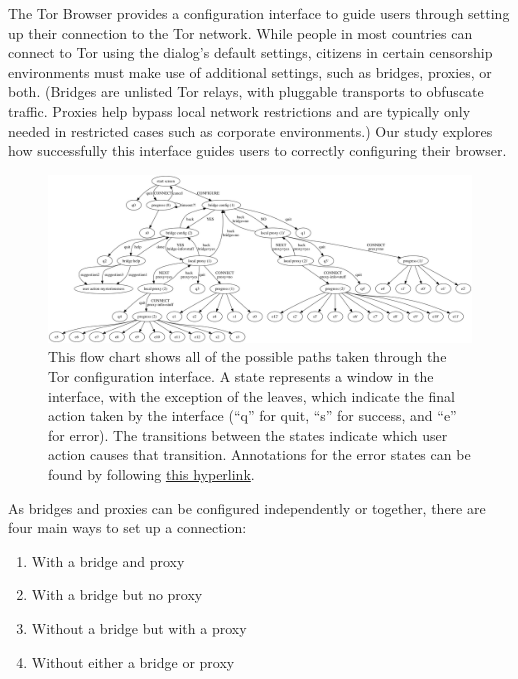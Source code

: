 \documentclass{template}
\begin{document}
The Tor Browser provides a configuration interface to guide users through setting up 
their connection to the
Tor network. While people in most countries can connect to Tor using the
dialog's default settings, citizens in certain censorship environments must
make use of additional settings, such as bridges, proxies, or both. 
(Bridges are unlisted Tor relays, with pluggable transports to obfuscate traffic.
Proxies help bypass local network restrictions and are typically only
needed in restricted cases such as corporate environments.)
Our study explores how successfully this interface guides users to
correctly configuring their browser.\\


\begin{figure}[t]
\label{fig:interface}
  \centering
    \includegraphics[width=\textwidth]{../torconfig.png}
    \caption{This flow chart shows all of the possible paths taken through the
    Tor configuration interface. A state represents a window in the interface,
    with the exception of the leaves, which indicate the final action taken by
    the interface (``q'' for quit, ``s'' for success, and ``e'' for error). The
    transitions between the states indicate which user action causes that
    transition. Annotations for the error states can be found by following
\href{https://github.com/lindanlee/circumvention-ux-tor/blob/master/torconfig.dot}{this hyperlink}.}
\end{figure}

As bridges and proxies can be configured independently or together, there are
four main ways to set up a connection:

\begin{enumerate} \itemsep1pt \parskip0pt 
    \item With a bridge and proxy
    \item With a bridge but no proxy
    \item Without a bridge but with a proxy
    \item Without either a bridge or proxy
\end{enumerate}
\end{document}
